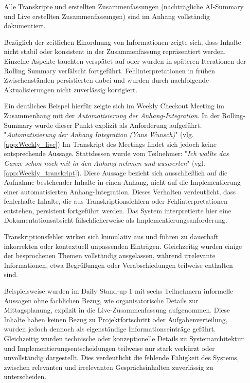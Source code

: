 Alle Transkripte und erstellten Zusammenfassungen (nachträgliche AI-Summary und Live erstellten Zusammenfassungen) sind im Anhang vollständig dokumentiert.

Bezüglich der zeitlichen Einordnung von Informationen zeigte sich, dass Inhalte nicht stabil oder konsistent in der Zusammenfassung repräsentiert werden. Einzelne Aspekte tauchten verspätet auf oder wurden in späteren Iterationen der Rolling Summary verfälscht fortgeführt. Fehlinterpretationen in frühen Zwischenständen persistierten dabei und wurden durch nachfolgende Aktualisierungen nicht zuverlässig korrigiert.  

Ein deutliches Beispel hierfür zeigte sich im Weekly Checkout Meeting im Zusammenhang mit der \textit{Automatisierung der Anhang-Integration}. In der Rolling-Summary wurde dieser Punkt explizit als Anforderung aufgeführt. "\textit{Automatisierung der Anhang Integration (Yans Wunsch)}" (vlg. \ref{app:Weekly_live})
Im Transkript des Meetings findet sich jedoch keine entsprechende Aussage. Stattdessen wurde vom Teilnehmer: "\textit{Ich wollte das Ganze schon noch mit in den Anhang nehmen und auswerten}" (vgl. \ref{app:Weekly_transkript}). Diese Aussage bezieht sich ausschließlich auf die Aufnahme bestehender Inhalte in einen Anhang, nicht auf die Implementierung einer automatisierten Anhang-Integration. Dieses Verhalten verdeutlicht, dass fehlerhafte Inhalte, die aus Transkriptionsfehlern oder Fehlinterpretationen entstehen, persistent fortgeführt werden. Das System interpretierte hier eine Dokumentationsabsicht fälschlicherweise als Implementierungsanforderung. 

Transkriptionsfehler wirken sich kumulativ aus und führen zu dauerhaft inkorrekten oder kontextuell unpassenden Einträgen. Gleichzeitig wurden einige der besprochenen Themen vollständig ausgelassen, während irrelevante Informationen, etwa Begrüßungen oder Verabschiedungen teilweise enthalten sind. 

Beispielsweise wurden im Daily Stand-up 1 mit sechs Teilnehmern informelle Aussagen ohne fachlichen Bezug, wie organisatorische Details zur Mittagsplanung, explizit in die Live-Zusammenfassung aufgenommen. Diese Inhalte haben keinen Bezug zu Projektfortschritt oder Aufgabenverteilung, wurden jedoch dennoch als eigenständige Informationseinträge geführt. Gleichzeitig wurden technische oder konzeptionelle Details zu Systemarchitektur und Implementierungsentscheidungen teilweise nur stark verkürzt oder unvollständig dargestellt. Dies verdeutlicht die fehlende Fähigkeit des Systems, zwischen relevanten und irrelevanten Gesprächsinhalten zuverlässig zu unterscheiden.

